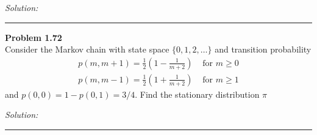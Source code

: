 \documentclass[a4paper, 11pt]{article}
\newenvironment{problem}[2][Problem]
    { \begin{mdframed}[backgroundcolor=gray!20] \textbf{#1 #2} \\}
    {  \end{mdframed}}
\newenvironment{solution}
    {\textit{Solution:}}
    {}
\begin{document}
\begin{solution}

\end{solution}
\noindent\rule{7in}{2.8pt}
\begin{problem}{1.72}
  Consider the Markov chain with state space \(\{0,1,2, \ldots\}\) and transition
  probability
  $$
  \begin{aligned} p(m, m+1)=\frac{1}{2}\left(1-\frac{1}{m+2}\right) & \text { for } m \geq 0 \\ p(m, m-1)=\frac{1}{2}\left(1+\frac{1}{m+2}\right) & \text { for } m \geq 1 \end{aligned}
  $$
  and \(p(0,0)=1-p(0,1)=3 / 4 .\) Find the stationary distribution \(\pi\)
\end{problem}

\begin{solution}

\end{solution}

\noindent\rule{7in}{2.8pt}
\end{document}
